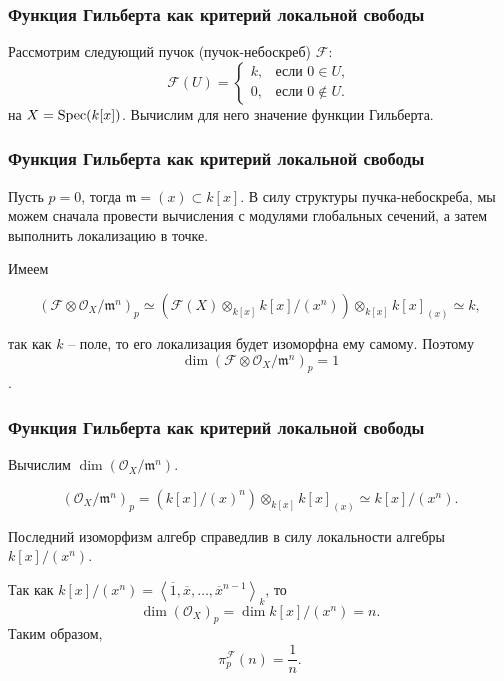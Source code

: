 \documentclass{beamer}
\newcommand{\ox}{\otimes}
\newcommand{\FF}{\mathcal{F}}
\newcommand{\OO}{\mathcal{O}}
\newcommand{\spec}[1]{\textup{Spec}(#1)}
\renewcommand{\bar}[1]{\overline{#1}}
\begin{document}
    \begin{frame}
        \frametitle{Функция Гильберта как критерий локальной свободы}

        Рассмотрим следующий пучок (пучок-небоскреб) $\FF$:
        \begin{equation*}
            \FF(U) = \begin{cases}
                k, & \text{если $0 \in U$},\\
                0, & \text{если $0 \not \in U$}.
            \end{cases}
        \end{equation*}
        на $X = \spec{k[x]}$. Вычислим для него значение функции Гильберта.
    \end{frame}

    \begin{frame}
        \frametitle{Функция Гильберта как критерий локальной свободы}

        Пусть $p = 0$, тогда $\mathfrak{m} = (x) \subset k[x]$. В силу структуры пучка-небоскреба, мы можем сначала провести вычисления с модулями глобальных сечений, а затем выполнить локализацию в точке.

        Имеем

        \begin{equation*}
            (\FF \ox \OO_X / \mathfrak{m}^n)_p \simeq (\FF(X) \ox_{k[x]} k[x] / (x^n)) \ox_{k[x]} k[x]_{(x)} \simeq k,
        \end{equation*}

        так как $k$ -- поле, то его локализация будет изоморфна ему самому.  Поэтому $$\dim (\FF \ox \OO_X / \mathfrak{m}^n)_p = 1$$.
    \end{frame}

    \begin{frame}
        \frametitle{Функция Гильберта как критерий локальной свободы}

        Вычислим $\dim(\OO_X / \mathfrak{m}^n)$.
        
        \begin{equation*}
            (\OO_X / \mathfrak{m}^n)_p = (k[x]/(x)^n) \ox_{k[x]} k[x]_{(x)} \simeq k[x] / (x^n).
        \end{equation*}
        
        Последний изоморфизм алгебр справедлив в силу локальности алгебры $k[x] / (x^n)$.
        
        Так как $k[x] / (x^n) = \left<\bar{1}, \bar{x}, \dots, \bar{x}^{n - 1} \right>_k$, то 
        \begin{equation*}
            \dim (\OO_{X})_p = \dim k[x]/(x^n) = n.
        \end{equation*}
        Таким образом, 
        \begin{equation*}
            \pi^{\FF}_p(n) = \frac{1}{n}.
        \end{equation*}
    \end{frame}
\end{document}
